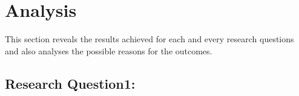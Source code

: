 \documentclass[a4paper, 11pt]{article}
\begin{document}







\pagebreak
\section{Analysis}

This section reveals the results achieved for each and every research questions and also analyses the possible reasons for the outcomes.

\subsection{Research Question1:}
\end{document}

